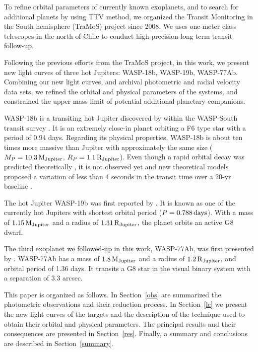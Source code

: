 To refine orbital parameters of currently known exoplanets, and to search for additional planets by using TTV method, we organized the Transit Monitoring in the South hemisphere (TraMoS) project \citep{Hoyer2011} since 2008. We uses one-meter class telescopes in the north of Chile to conduct high-precision long-term transit follow-up. 

Following the previous efforts from the TraMoS project, in this work, we present new light curves of three hot Jupiters: WASP-18b, WASP-19b, WASP-77Ab. Combining our new light curves, and archival photometric and radial velocity data sets, we refined the orbital and physical parameters of the systems, and constrained the upper mass limit of potential additional planetary companions. 

WASP-18b is a transiting hot Jupiter discovered by \citet{Hellier2009} within the WASP-South transit survey \citep{Pollacco2006}. It is an extremely close-in planet orbiting a F6 type star with a period of 0.94 days. Regarding its physical properties, WASP-18b is about ten times more massive than Jupiter with approximately the same size ($M_{P}=10.3\,{\rm M_{Jupiter}}$, $R_{P}=1.1\,{\rm R_{Jupiter}}$). Even though a rapid orbital decay was predicted theoretically \citep{Hellier2009}, it is not observed yet \citep{Wilkins2017} and new theoretical models proposed a variation of less than 4 seconds in the transit time over a 20-yr baseline \citep{CollierCameron2018}.

The hot Jupiter WASP-19b was first reported by \cite{Hebb2010}. It is known as one of the currently hot Jupiters with shortest orbital period ($P=0.788\,{\rm days}$). With a mass of $1.15\,{\rm M_{Jupiter}}$ and a radius of $1.31\,{\rm R_{Jupiter}}$, the planet orbits an active G8 dwarf.

The third exoplanet we followed-up in this work, WASP-77Ab, was first presented by \cite{Maxted2013}. WASP-77Ab has a mass of $1.8\,{\rm M_{Jupiter}}$ and a radius of $1.2\,{\rm R_{Jupiter}}$, and orbital period of 1.36 days. It transits a G8 star in the visual binary system with a separation of 3.3 arcsec.

This paper is organized as follows. In Section~\ref{obs} are summarized the photometric observations and their reduction process. In Section~\ref{lc} we present the new light curves of the targets and the description of the technique used to obtain their orbital and physical parameters. The principal results and their consequences are presented in Section~\ref{res}. Finally, a summary and conclusions are described in Section~\ref{summary}.


